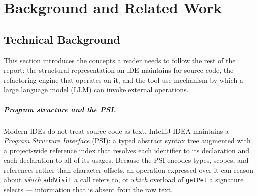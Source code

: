%
\chapter{Background and Related Work}
\label{ch:background}

\section{Technical Background}
\label{sec:bg-technical}

This section introduces the concepts a reader needs to follow the rest of the
report: the structural representation an IDE maintains for source code, the
refactoring engine that operates on it, and the tool-use mechanism by which a
large language model (LLM) can invoke external operations.

\paragraph{Program structure and the PSI.} Modern IDEs do not treat source code
as text. IntelliJ IDEA maintains a \emph{Program Structure Interface} (PSI): a
typed abstract syntax tree augmented with a project-wide reference index that
resolves each identifier to its declaration and each declaration to all of its
usages. Because the PSI encodes types, scopes, and references rather than
character offsets, an operation expressed over it can reason about \emph{which}
\texttt{addVisit} a call refers to, or \emph{which} overload of \texttt{getPet}
a signature selects --- information that is absent from the raw text.

